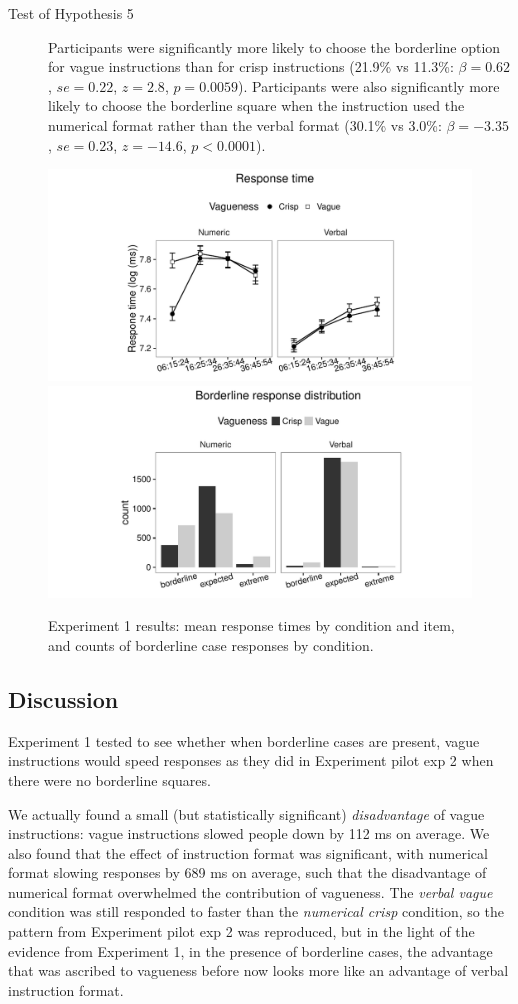 \begin{description}
	\item [Test of Hypothesis 5] Participants were significantly more likely to choose the borderline option for vague instructions than for crisp instructions (21.9\% vs 11.3\%: $\beta=0.62$, $se=0.22$, $z=2.8$, $p=0.0059$). Participants were also significantly more likely to choose the borderline square when the instruction used the numerical format rather than the verbal format (30.1\% vs 3.0\%: $\beta=-3.35$, $se=0.23$, $z=-14.6$, $p<0.0001$). 
\end{description}

\begin{figure}[htbp]
\centering
\includegraphics[trim = 20mm 0mm 35mm 0mm, clip, width=.49\textwidth]{figures/Ce1-rtplot-1.pdf}
\includegraphics[trim = 20mm 0mm 35mm 0mm, clip, width=.49\textwidth]{figures/Ce1-blBarChart-1}
\caption{Experiment 1 results: mean response times by condition and item, and counts of borderline case responses by condition.}
\label{resultsC-exp-1}
\end{figure}

\subsection{Discussion}

Experiment 1 tested to see whether when borderline cases are present, vague instructions would speed responses as they did in Experiment pilot exp 2 when there were no borderline squares. 

We actually found a small (but statistically significant) \emph{disadvantage} of vague instructions: vague instructions slowed people down by 112 ms on average. We also found that the effect of instruction format was significant, with numerical format slowing responses by 689 ms on average, such that the disadvantage of numerical format overwhelmed the contribution of vagueness. The \emph{verbal vague} condition was still responded to faster than the \emph{numerical crisp} condition, so the pattern from Experiment pilot exp 2 was reproduced, but in the light of the evidence from Experiment 1, in the presence of borderline cases, the advantage that was ascribed to vagueness before now looks more like an advantage of verbal instruction format.

